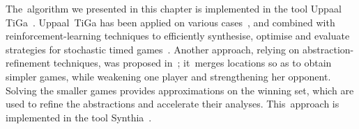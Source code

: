 The~algorithm we presented in this chapter is implemented in the tool
Uppaal TiGa~\cite{BCD+07}. Uppaal~TiGa has been applied on various
cases~\cite{CJLRR09,Sor14}, and combined with
reinforcement-learning techniques to efficiently synthesise, optimise
and evaluate strategies for stochastic timed games~\cite{DJLMT15}.
%
Another approach, relying on
abstraction-refinement techniques, was proposed in~\cite{EMP10};
it~merges locations so as to obtain simpler games, while weakening one
player and strengthening her opponent. Solving the smaller games
provides approximations on the winning set, which are used to refine
the abstractions and accelerate their analyses. This~approach is
implemented in the tool Synthia~\cite{PEM11}.

